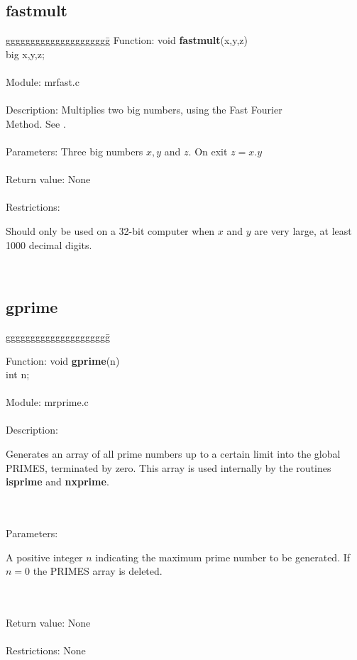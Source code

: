 \subsection{fastmult}
\begin{tabbing}
ggggggggggggggggggggg\= \kill
      Function:      \>void {\bf fastmult}(x,y,z) \\
                     \>big x,y,z;   \\

      \ \\
      Module:        \>mrfast.c       \\
      \ \\
      Description:   \>Multiplies two big numbers, using the Fast Fourier\\ 
                     \>Method. See \cite{Pollard}.   \\
      \ \\
      Parameters:    \>Three big numbers $x, y$ and $z$. On exit $z=x.y$\\
      \ \\
      Return value:  \>None \\
      \ \\
      Restrictions:  \>
                     \parbox[t]{3 in}
                     {Should only be used on a 32-bit computer when $x$
                      and $y$ are very large, at least 1000 decimal digits.} \\ 

         
\end{tabbing}
\subsection{gprime}

\begin{tabbing}
ggggggggggggggggggggg\= \kill


      Function:      \>void {\bf gprime}(n) \\
                     \>int n; \\
      \ \\
      Module:        \>mrprime.c \\
      \ \\
      Description:   \>
                     \parbox[t]{3in}
                     {Generates an array of all prime numbers up to a certain
                     limit into the global PRIMES, terminated by zero. This
                     array is used internally by the routines {\bf isprime} and 
                     {\bf nxprime}.} \\
      \ \\
      Parameters:    \>
                     \parbox[t]{3in}
                     {A positive integer $n$ indicating the maximum prime
                     number to be generated. If $n=0$ the PRIMES array is 
                     deleted.} \\
      \ \\
      Return value:  \>None \\
      \ \\
      Restrictions:  \>None \\

\end{tabbing}
